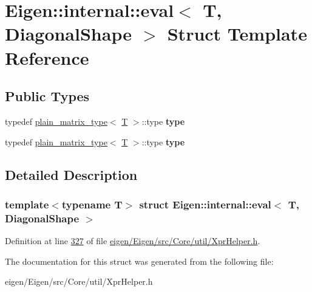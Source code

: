 \hypertarget{struct_eigen_1_1internal_1_1eval_3_01_t_00_01_diagonal_shape_01_4}{}\section{Eigen\+:\+:internal\+:\+:eval$<$ T, Diagonal\+Shape $>$ Struct Template Reference}
\label{struct_eigen_1_1internal_1_1eval_3_01_t_00_01_diagonal_shape_01_4}
\subsection*{Public Types}
\begin{DoxyCompactItemize}
\item 
\mbox{\label{struct_eigen_1_1internal_1_1eval_3_01_t_00_01_diagonal_shape_01_4_a41a0f100ce6d787321b16082a103423b}} 
typedef \hyperlink{struct_eigen_1_1internal_1_1plain__matrix__type}{plain\+\_\+matrix\+\_\+type}$<$ \hyperlink{group___sparse_core___module}{T} $>$\+::type {\bfseries type}
\item 
\mbox{\label{struct_eigen_1_1internal_1_1eval_3_01_t_00_01_diagonal_shape_01_4_a41a0f100ce6d787321b16082a103423b}} 
typedef \hyperlink{struct_eigen_1_1internal_1_1plain__matrix__type}{plain\+\_\+matrix\+\_\+type}$<$ \hyperlink{group___sparse_core___module}{T} $>$\+::type {\bfseries type}
\end{DoxyCompactItemize}


\subsection{Detailed Description}
\subsubsection*{template$<$typename T$>$\newline
struct Eigen\+::internal\+::eval$<$ T, Diagonal\+Shape $>$}



Definition at line \hyperlink{eigen_2_eigen_2src_2_core_2util_2_xpr_helper_8h_source_l00327}{327} of file \hyperlink{eigen_2_eigen_2src_2_core_2util_2_xpr_helper_8h_source}{eigen/\+Eigen/src/\+Core/util/\+Xpr\+Helper.\+h}.



The documentation for this struct was generated from the following file\+:\begin{DoxyCompactItemize}
\item 
eigen/\+Eigen/src/\+Core/util/\+Xpr\+Helper.\+h\end{DoxyCompactItemize}
